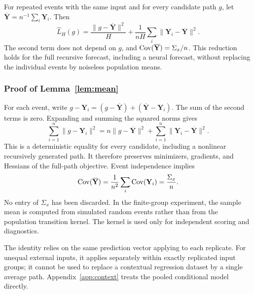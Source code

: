 \begin{lemma}
\label{lem:mean}
For repeated events with the same input and for every candidate path $g$, let $\overline{\mathbf Y}=n^{-1}\sum_i\mathbf Y_i$. Then
\begin{equation}
 \widehat L_H(g)
 =\frac{\|g-\overline{\mathbf Y}\|^2}{H}
 +\frac1{nH}\sum_i\|\mathbf Y_i-\overline{\mathbf Y}\|^2.
 \label{eq:mean_reduction}
\end{equation}
The second term does not depend on $g$, and $\operatorname{Cov}(\overline{\mathbf Y})=\Sigma_x/n$. This reduction holds for the full recursive forecast, including a neural forecast, without replacing the individual events by noiseless population means.
\end{lemma}

\subsubsection{Proof of Lemma~\ref{lem:mean}}
For each event, write $g-\mathbf Y_i=(g-\overline{\mathbf Y})+(\overline{\mathbf Y}-\mathbf Y_i)$. The sum of the second terms is zero. Expanding and summing the squared norms gives
\[
 \sum_{i=1}^n\|g-\mathbf Y_i\|^2
 =n\|g-\overline{\mathbf Y}\|^2+
          \sum_{i=1}^n\|\mathbf Y_i-\overline{\mathbf Y}\|^2.
\]
This is a deterministic equality for every candidate, including a nonlinear recursively generated path. It therefore preserves minimizers, gradients, and Hessians of the full-path objective. Event independence implies
\[
 \operatorname{Cov}(\overline{\mathbf Y})=\frac1{n^2}\sum_i\operatorname{Cov}(\mathbf Y_i)=\frac{\Sigma_x}{n}.
\]
No entry of $\Sigma_x$ has been discarded. In the finite-group experiment, the sample mean is computed from simulated random events rather than from the population transition kernel. The kernel is used only for independent scoring and diagnostics.

The identity relies on the same prediction vector applying to each replicate. For unequal external inputs, it applies separately within exactly replicated input groups; it cannot be used to replace a contextual regression dataset by a single average path. Appendix~\ref{app:context} treats the pooled conditional model directly.

